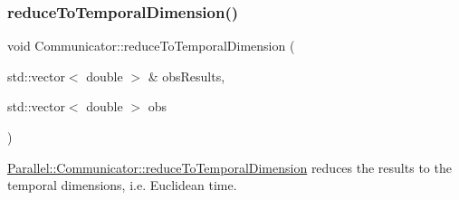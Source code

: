 \subsubsection{\texorpdfstring{reduceToTemporalDimension()}{reduceToTemporalDimension()}}
{\footnotesize\ttfamily void Communicator\+::reduce\+To\+Temporal\+Dimension (\begin{DoxyParamCaption}\item[{std\+::vector$<$ double $>$ \&}]{obs\+Results,  }\item[{std\+::vector$<$ double $>$}]{obs }\end{DoxyParamCaption})\hspace{0.3cm}{\ttfamily [static]}}



\mbox{\hyperlink{class_parallel_1_1_communicator_a5d42989e7a3022de6042e3503aa35346}{Parallel\+::\+Communicator\+::reduce\+To\+Temporal\+Dimension}} reduces the results to the temporal dimensions, i.\+e. Euclidean time. 


